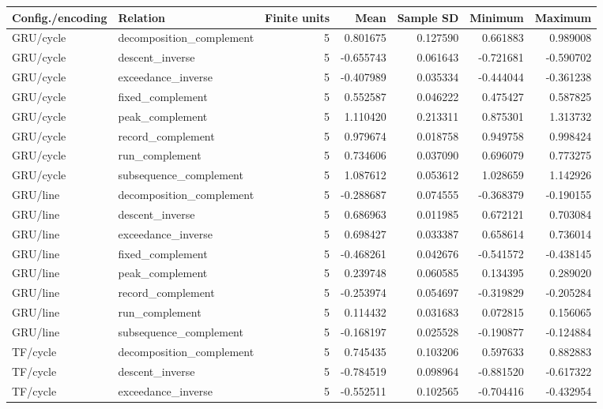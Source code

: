 \begin{table}[p]\centering\scriptsize
\begin{tabular}{llrrrrr}\toprule
Config./encoding & Relation & Finite units & Mean & Sample SD & Minimum & Maximum\\\midrule
GRU/cycle & decomposition\_complement & 5 & 0.801675 & 0.127590 & 0.661883 & 0.989008\\
GRU/cycle & descent\_inverse & 5 & -0.655743 & 0.061643 & -0.721681 & -0.590702\\
GRU/cycle & exceedance\_inverse & 5 & -0.407989 & 0.035334 & -0.444044 & -0.361238\\
GRU/cycle & fixed\_complement & 5 & 0.552587 & 0.046222 & 0.475427 & 0.587825\\
GRU/cycle & peak\_complement & 5 & 1.110420 & 0.213311 & 0.875301 & 1.313732\\
GRU/cycle & record\_complement & 5 & 0.979674 & 0.018758 & 0.949758 & 0.998424\\
GRU/cycle & run\_complement & 5 & 0.734606 & 0.037090 & 0.696079 & 0.773275\\
GRU/cycle & subsequence\_complement & 5 & 1.087612 & 0.053612 & 1.028659 & 1.142926\\
GRU/line & decomposition\_complement & 5 & -0.288687 & 0.074555 & -0.368379 & -0.190155\\
GRU/line & descent\_inverse & 5 & 0.686963 & 0.011985 & 0.672121 & 0.703084\\
GRU/line & exceedance\_inverse & 5 & 0.698427 & 0.033387 & 0.658614 & 0.736014\\
GRU/line & fixed\_complement & 5 & -0.468261 & 0.042676 & -0.541572 & -0.438145\\
GRU/line & peak\_complement & 5 & 0.239748 & 0.060585 & 0.134395 & 0.289020\\
GRU/line & record\_complement & 5 & -0.253974 & 0.054697 & -0.319829 & -0.205284\\
GRU/line & run\_complement & 5 & 0.114432 & 0.031683 & 0.072815 & 0.156065\\
GRU/line & subsequence\_complement & 5 & -0.168197 & 0.025528 & -0.190877 & -0.124884\\
TF/cycle & decomposition\_complement & 5 & 0.745435 & 0.103206 & 0.597633 & 0.882883\\
TF/cycle & descent\_inverse & 5 & -0.784519 & 0.098964 & -0.881520 & -0.617322\\
TF/cycle & exceedance\_inverse & 5 & -0.552511 & 0.102565 & -0.704416 & -0.432954\\

\end{tabular}
\end{table}
